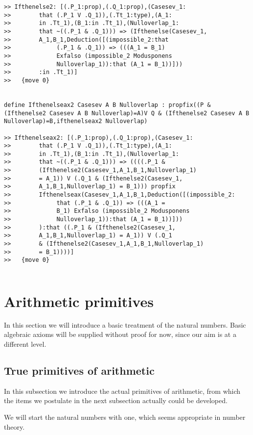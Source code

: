 \documentclass[12pt]{article}
\begin{document}
\begin{verbatim}
>> Ifthenelse2: [(.P_1:prop),(.Q_1:prop),(Casesev_1:
>>        that (.P_1 V .Q_1)),(.Tt_1:type),(A_1:
>>        in .Tt_1),(B_1:in .Tt_1),(Nulloverlap_1:
>>        that ~((.P_1 & .Q_1))) => (Ifthenelse(Casesev_1,
>>        A_1,B_1,Deduction([(impossible_2:that 
>>             (.P_1 & .Q_1)) => (((A_1 = B_1) 
>>             Exfalso (impossible_2 Modusponens 
>>             Nulloverlap_1)):that (A_1 = B_1))]))
>>        :in .Tt_1)]
>>   {move 0}


define Ifthenelseax2 Casesev A B Nulloverlap : propfix((P & (Ifthenelse2 Casesev A B Nulloverlap)=A)V Q & (Ifthenelse2 Casesev A B Nulloverlap)=B,ifthenelseax2 Nulloverlap)

>> Ifthenelseax2: [(.P_1:prop),(.Q_1:prop),(Casesev_1:
>>        that (.P_1 V .Q_1)),(.Tt_1:type),(A_1:
>>        in .Tt_1),(B_1:in .Tt_1),(Nulloverlap_1:
>>        that ~((.P_1 & .Q_1))) => ((((.P_1 & 
>>        (Ifthenelse2(Casesev_1,A_1,B_1,Nulloverlap_1) 
>>        = A_1)) V (.Q_1 & (Ifthenelse2(Casesev_1,
>>        A_1,B_1,Nulloverlap_1) = B_1))) propfix 
>>        Ifthenelseax(Casesev_1,A_1,B_1,Deduction([(impossible_2:
>>             that (.P_1 & .Q_1)) => (((A_1 = 
>>             B_1) Exfalso (impossible_2 Modusponens 
>>             Nulloverlap_1)):that (A_1 = B_1))]))
>>        ):that ((.P_1 & (Ifthenelse2(Casesev_1,
>>        A_1,B_1,Nulloverlap_1) = A_1)) V (.Q_1 
>>        & (Ifthenelse2(Casesev_1,A_1,B_1,Nulloverlap_1) 
>>        = B_1))))]
>>   {move 0}


\end{verbatim}


\section{Arithmetic primitives}

In this section we will introduce a basic treatment of the natural numbers.  Basic algebraic axioms will be supplied without proof for now, since our aim is at a different level.

\subsection{True primitives of arithmetic}

In this subsection we introduce the actual primitives of arithmetic, from which the items we postulate in the next subsection actually could be developed.

We will start the natural numbers with one, which seems appropriate in number theory.
\end{document}
